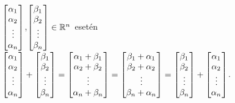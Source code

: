 \documentclass[a4paper,11.5pt]{article}
\begin{document}
	{\centering
	$\begin{bmatrix}
	\alpha_{1}\s \\
	\alpha_{2}\s \\
	\vdots\\
	\alpha_{n}\s \\
	\end{bmatrix}$,$
	\begin{bmatrix}
	\beta_{1}\s \\
	\beta_{2}\s \\
	\vdots\\
	\beta_{n}\s \\
	\end{bmatrix} \in  \Rn$~esetén  
		$\begin{bmatrix}
		\alpha_{1}\s \\
		\alpha_{2}\s \\
		\vdots\\
		\alpha_{n}\s \\
		\end{bmatrix}+
		\begin{bmatrix}
		\beta_{1}\s \\
		\beta_{2}\s \\
		\vdots\\
		\beta_{n}\s \\
		\end{bmatrix}=
		\begin{bmatrix}
		\alpha_{1}+\beta_{1}\s \\
		\alpha_{2}+\beta_2\s \\
		\vdots\\
		\alpha_{n}+\beta_n\s \\
		\end{bmatrix}=
		\begin{bmatrix}
		\beta_1+\alpha_{1}\s \\
		\beta_2+\alpha_{2}\s \\
		\vdots\\
		\beta_n+\alpha_{n}\s \\
		\end{bmatrix}=
		\begin{bmatrix}
		\beta_{1}\s \\
		\beta_{2}\s \\
		\vdots\\
		\beta_{n}\s \\
		\end{bmatrix}+
		\begin{bmatrix}
		\alpha_{1}\s \\
		\alpha_{2}\s \\
		\vdots\\
		\alpha_{n}\s \\
		\end{bmatrix}$.
		\par}
	
\end{document}
